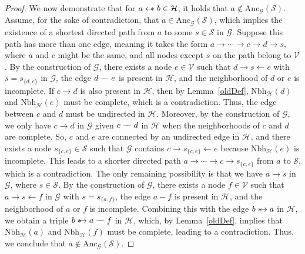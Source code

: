 \documentclass[accepted]{uai2025} %
\newcommand{\anc}{\text{Anc}}
\newcommand{\tuh}{\mathrel{\rightarrow}}
\newcommand{\hus}{\mathrel{{\leftarrow\mkern-11mu\ast}}}
\newcommand{\suh}{\mathrel{{\ast\mkern-11mu\to}}}
\newcommand{\tut}{\mathrel{{\relbar\mkern-9mu\relbar}}}
\begin{document}
\begin{proof}
We now demonstrate that for \( a \hus b \in \mathcal{H} \), it holds that \( a \notin \anc_{\mathcal{G}}(\mathcal{S}) \). Assume, for the sake of contradiction, that \( a \in \anc_{\mathcal{G}}(\mathcal{S}) \), which implies the existence of a shortest directed path from $a$ to some $s\in\mathcal{S}$ in $\mathcal{G}$. Suppose this path has more than one edge, meaning it takes the form \( a \rightarrow \cdots \rightarrow c \rightarrow d \rightarrow s \), where $a$ and $c$ might be the same, and all nodes except $s$ on the path belong to \( \mathcal{V} \). By the construction of \( \mathcal{G} \), there exists a node \( e \in \mathcal{V} \) such that \( d \rightarrow s \leftarrow e \) with \( s = s_{\{d, e\}} \) in \( \mathcal{G} \), the edge \( d \tut e \) is present in \( \mathcal{H} \), and the neighborhood of \( d \) or \( e \) is incomplete. If \( c \rightarrow d \) is also present in \( \mathcal{H} \), then by Lemma~\ref{oldDef}, \( \text{Nbh}_\mathcal{H}(d) \) and \( \text{Nbh}_\mathcal{H}(e) \) must be complete, which is a contradiction. Thus, the edge between \( c \) and \( d \) must be undirected in \( \mathcal{H} \). Moreover, by the construction of \( \mathcal{G} \), we only have \( c \tuh d \) in \( \mathcal{G} \) given \( c \tut d \) in \( \mathcal{H} \) when the neighborhoods of \( c \) and \( d \) are complete. So, \( c \) and \( e \) are connected by an undirected edge in \( \mathcal{H} \), and there exists a node \( s_{\{c,e\}} \in \mathcal{S} \) such that \( \mathcal{G} \) contains \( c \rightarrow s_{\{c,e\}} \leftarrow e \) because \( \text{Nbh}_\mathcal{H}(e) \) is incomplete. This leads to a shorter directed path \( a \rightarrow \cdots \rightarrow c \rightarrow s_{\{c,e\}} \) from \( a \) to \( \mathcal{S} \), which is a contradiction. The only remaining possibility is that we have \( a \rightarrow s \) in \( \mathcal{G} \), where \( s \in \mathcal{S} \). By the construction of \( \mathcal{G} \), there exists a node \( f \in \mathcal{V} \) such that \( a \rightarrow s \leftarrow f \) in \( \mathcal{G} \) with \( s = s_{\{a, f\}} \), the edge \( a - f \) is present in \( \mathcal{H} \), and the neighborhood of \( a \) or \( f \) is incomplete. Combining this with the edge \( b \suh a \) in \( \mathcal{H} \), we obtain a triple \( b \suh a \tut f \) in \( \mathcal{H} \), which, by Lemma~\ref{oldDef}, implies that \( \text{Nbh}_\mathcal{H}(a) \) and \( \text{Nbh}_\mathcal{H}(f) \) must be complete, leading to a contradiction. Thus, we conclude that \( a \notin \anc_{\mathcal{G}}(\mathcal{S}) \).


\end{proof}
\end{document}
